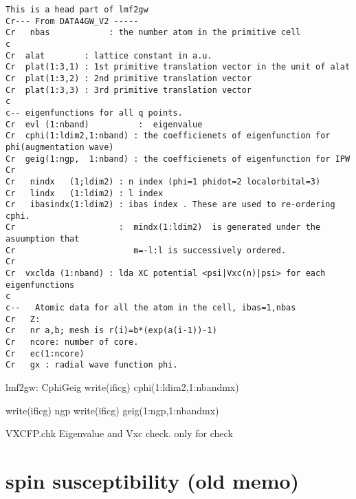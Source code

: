 \documentclass[a4paper,10pt,epsf,fleqn]{article}
\newcommand{\io}[1]{{\sf  #1}}
\begin{document}
\begin{verbatim}
This is a head part of lmf2gw
Cr--- From DATA4GW_V2 -----
Cr   nbas            : the number atom in the primitive cell
c
Cr  alat        : lattice constant in a.u.
Cr  plat(1:3,1) : 1st primitive translation vector in the unit of alat
Cr  plat(1:3,2) : 2nd primitive translation vector
Cr  plat(1:3,3) : 3rd primitive translation vector
c
c-- eigenfunctions for all q points.
Cr  evl (1:nband)          :  eigenvalue
Cr  cphi(1:ldim2,1:nband) : the coefficienets of eigenfunction for phi(augmentation wave)
Cr  geig(1:ngp,  1:nband) : the coefficienets of eigenfunction for IPW
Cr
Cr   nindx   (1;ldim2) : n index (phi=1 phidot=2 localorbital=3)
Cr   lindx   (1:ldim2) : l index
Cr   ibasindx(1:ldim2) : ibas index . These are used to re-ordering cphi.
Cr                     :  mindx(1:ldim2)  is generated under the asuumption that
Cr                        m=-l:l is successively ordered.
Cr
Cr  vxclda (1:nband) : lda XC potential <psi|Vxc(n)|psi> for each eigenfunctions
c
c--   Atomic data for all the atom in the cell, ibas=1,nbas
Cr   Z:
Cr   nr a,b; mesh is r(i)=b*(exp(a(i-1))-1)
Cr   ncore: number of core.
Cr   ec(1:ncore)
Cr   gx : radial wave function phi.
\end{verbatim}

lmf2gw:
\io{CphiGeig}
          write(ificg) cphi(1:ldim2,1:nbandmx)

          write(ificg) ngp
          write(ificg) geig(1:ngp,1:nbandmx)

\io{VXCFP.chk} Eigenvalue and Vxc check. only for check\\

\newpage
\section{spin susceptibility (old memo)}

\newpage
\end{document}
